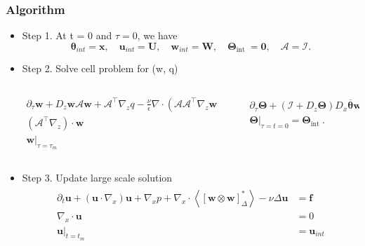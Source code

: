 \documentclass[aspectratio=169]{beamer}
\begin{document}
\begin{frame}[c]\frametitle{Algorithm}
	\begin{itemize}
		\item Step 1. At t = 0 and $\tau = 0$, we have 
		\begin{equation*}
			\boldsymbol{\theta}_{i n t}=\mathbf{x}, \quad \mathbf{u}_{i n t}=\mathbf{U}, \quad \mathbf{w}_{i n t}=\mathbf{W}, \quad \mathbf{\Theta}_{\text {int }}=\mathbf{0}, \quad \mathcal{A}=\mathcal{I} .
		\end{equation*}
		\item Step 2. Solve cell problem for (w, q)
		\begin{columns}
			\begin{column}{0.7\textwidth}
				\begin{align*}
					\partial_\tau \mathbf{w}+D_z \mathbf{w} \mathcal{A} \mathbf{w}+\mathcal{A}^{\top} \nabla_z q-\frac{\nu}{\epsilon} \nabla \cdot\left(\mathcal{A} \mathcal{A}^{\top} \nabla_z \mathbf{w}\right)&=\mathbf{0}\\
					\left(\mathcal{A}^{\top} \nabla_z\right) \cdot \mathbf{w}&=0\\
					\left.\mathbf{w}\right|_{\tau=\tau_m}&=\mathbf{w}_{i n t}
				\end{align*}
			\end{column}
			\begin{column}{0.3\textwidth}
				\begin{align*}
					\begin{aligned}
						& \partial_\tau \boldsymbol{\Theta}+\left(\mathcal{I}+D_z \boldsymbol{\Theta}\right) D_x \overline{\boldsymbol{\theta}} \mathbf{w}=\mathbf{0} . \\
						& \left.\boldsymbol{\Theta}\right|_{\tau=t=0}=\boldsymbol{\Theta}_{\text {int }} .
					\end{aligned}
				\end{align*}
			\end{column}
		\end{columns}
		
		\item Step 3. Update large scale solution
				\begin{align*}
					\begin{aligned}
						\partial_t \mathbf{u}+\left(\mathbf{u} \cdot \nabla_x\right) \mathbf{u}+\nabla_x p+\nabla_x \cdot\left\langle[\mathbf{w} \otimes \mathbf{w}]_{\Delta}^*\right\rangle-\nu \Delta \mathbf{u}&=\mathbf{f} \\
						\nabla_x \cdot \mathbf{u}&=0\\
						 \left.\mathbf{u}\right|_{t=t_m}&=\mathbf{u}_{i n t}
					\end{aligned}
				\end{align*}
			

\end{itemize}
\end{frame}
\end{document}
